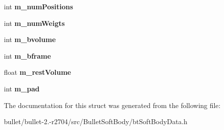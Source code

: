 \begin{DoxyCompactItemize}
\item 
\hypertarget{struct_soft_body_pose_data_a562e708b792125bc9f844b363636659e}{int {\bfseries m\+\_\+num\+Positions}}\label{struct_soft_body_pose_data_a562e708b792125bc9f844b363636659e}

\item 
\hypertarget{struct_soft_body_pose_data_a73ac96f9dafa067f9f2d80bb876d77a3}{int {\bfseries m\+\_\+num\+Weigts}}\label{struct_soft_body_pose_data_a73ac96f9dafa067f9f2d80bb876d77a3}

\item 
\hypertarget{struct_soft_body_pose_data_ab9cf31ad71d65de90d826917bd58fab2}{int {\bfseries m\+\_\+bvolume}}\label{struct_soft_body_pose_data_ab9cf31ad71d65de90d826917bd58fab2}

\item 
\hypertarget{struct_soft_body_pose_data_ad8f20e6a915c17541a3584f24ef75e38}{int {\bfseries m\+\_\+bframe}}\label{struct_soft_body_pose_data_ad8f20e6a915c17541a3584f24ef75e38}

\item 
\hypertarget{struct_soft_body_pose_data_af404e47f7a1beaf49675175b3bc8bdfa}{float {\bfseries m\+\_\+rest\+Volume}}\label{struct_soft_body_pose_data_af404e47f7a1beaf49675175b3bc8bdfa}

\item 
\hypertarget{struct_soft_body_pose_data_a01e4dd2c137b006770acf34ddd05ed80}{int {\bfseries m\+\_\+pad}}\label{struct_soft_body_pose_data_a01e4dd2c137b006770acf34ddd05ed80}

\end{DoxyCompactItemize}


The documentation for this struct was generated from the following file\+:\begin{DoxyCompactItemize}
\item 
bullet/bullet-\/2.-\/r2704/src/\+Bullet\+Soft\+Body/bt\+Soft\+Body\+Data.\+h\end{DoxyCompactItemize}
